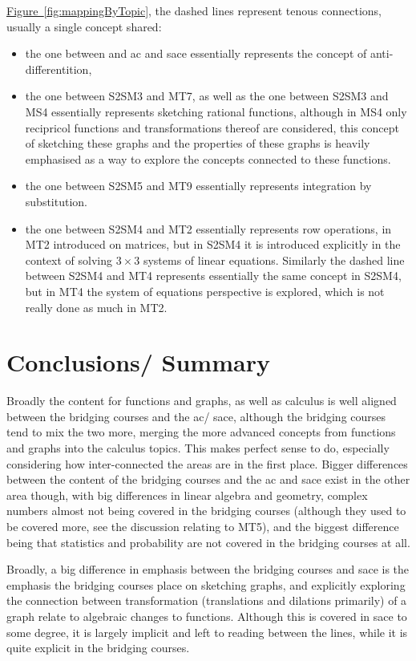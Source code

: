 \documentclass[twoside,12pt,a4paper]{report}
\newcommand{\reffig}[1]{\hyperref[fig:#1]{Figure~\ref{fig:#1}}}
\begin{document}
\reffig{mappingByTopic}, the dashed lines represent tenous connections, usually a single concept shared:
\begin{itemize}
	\item the one between and \gls{ac} and \gls{sace} essentially represents the concept of anti-differentition,
	\item the one between S2SM3 and MT7, as well as the one between S2SM3 and MS4 essentially represents sketching rational functions, although in MS4 only recipricol functions and transformations thereof are considered, this concept of sketching these graphs and the properties of these graphs is heavily emphasised as a way to explore the concepts connected to these functions.
	\item the one between S2SM5 and MT9 essentially represents integration by substitution.
	\item the one between S2SM4 and MT2 essentially represents row operations, in MT2 introduced on matrices, but in S2SM4 it is introduced explicitly in the context of solving $3 \times 3$ systems of linear equations. Similarly the dashed line between S2SM4 and MT4 represents essentially the same concept in S2SM4, but in MT4 the system of equations perspective is explored, which is not really done as much in MT2.
\end{itemize}




\section{Conclusions/ Summary}

Broadly the content for functions and graphs, as well as calculus is well aligned between the bridging courses and the \gls{ac}/ \gls{sace}, although the bridging courses tend to mix the two more, merging the more advanced concepts from functions and graphs into the calculus topics. This makes perfect sense to do, especially considering how inter-connected the areas are in the first place. Bigger differences between the content of the bridging courses and the \gls{ac} and \gls{sace} exist in the other area though, with big differences in linear algebra and geometry, complex numbers almost not being covered in the bridging courses (although they used to be covered more, see the discussion relating to MT5), and the biggest difference being that statistics and probability are not covered in the bridging courses at all.

Broadly, a big difference in emphasis between the bridging courses and \gls{sace} is the emphasis the bridging courses place on sketching graphs, and explicitly exploring the connection between transformation (translations and dilations primarily) of a graph relate to algebraic changes to functions. Although this is covered in \gls{sace} to some degree, it is largely implicit and left to reading between the lines, while it is quite explicit in the bridging courses. 
\end{document}
